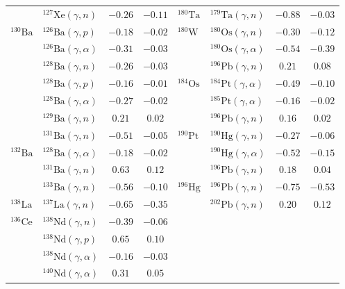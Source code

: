 \begin{table}
\begin{tabular}{llcc|llcc}
    $ $ & $^{127}\mathrm{Xe}(\gamma,n)$ & $-0.26$ & $-0.11$ & $^{180}\mathrm{Ta}$ & $^{179}\mathrm{Ta}(\gamma,n)$ & $-0.88$ & $-0.03$ \\ 
    $^{130}\mathrm{Ba}$ & $^{126}\mathrm{Ba}(\gamma,p)$ & $-0.18$ & $-0.02$ & $^{180}\mathrm{W}$ & $^{180}\mathrm{Os}(\gamma,n)$ & $-0.30$ & $-0.12$ \\ 
    $ $ & $^{126}\mathrm{Ba}(\gamma,\alpha)$ & $-0.31$ & $-0.03$ & $ $ & $^{180}\mathrm{Os}(\gamma,\alpha)$ & $-0.54$ & $-0.39$ \\ 
    $ $ & $^{128}\mathrm{Ba}(\gamma,n)$ & $-0.26$ & $-0.03$ & $ $ & $^{196}\mathrm{Pb}(\gamma,n)$ & $0.21$ & $0.08$ \\ 
    $ $ & $^{128}\mathrm{Ba}(\gamma,p)$ & $-0.16$ & $-0.01$ & $^{184}\mathrm{Os}$ & $^{184}\mathrm{Pt}(\gamma,\alpha)$ & $-0.49$ & $-0.10$ \\ 
    $ $ & $^{128}\mathrm{Ba}(\gamma,\alpha)$ & $-0.27$ & $-0.02$ & $ $ & $^{185}\mathrm{Pt}(\gamma,\alpha)$ & $-0.16$ & $-0.02$ \\ 
    $ $ & $^{129}\mathrm{Ba}(\gamma,n)$ & $0.21$ & $0.02$ & $ $ & $^{196}\mathrm{Pb}(\gamma,n)$ & $0.16$ & $0.02$ \\ 
    $ $ & $^{131}\mathrm{Ba}(\gamma,n)$ & $-0.51$ & $-0.05$ & $^{190}\mathrm{Pt}$ & $^{190}\mathrm{Hg}(\gamma,n)$ & $-0.27$ & $-0.06$ \\ 
    $^{132}\mathrm{Ba}$ & $^{128}\mathrm{Ba}(\gamma,\alpha)$ & $-0.18$ & $-0.02$ & $ $ & $^{190}\mathrm{Hg}(\gamma,\alpha)$ & $-0.52$ & $-0.15$ \\ 
    $ $ & $^{131}\mathrm{Ba}(\gamma,n)$ & $0.63$ & $0.12$ & $ $ & $^{196}\mathrm{Pb}(\gamma,n)$ & $0.18$ & $0.04$ \\ 
    $ $ & $^{133}\mathrm{Ba}(\gamma,n)$ & $-0.56$ & $-0.10$ & $^{196}\mathrm{Hg}$ & $^{196}\mathrm{Pb}(\gamma,n)$ & $-0.75$ & $-0.53$ \\ 
    $^{138}\mathrm{La}$ & $^{137}\mathrm{La}(\gamma,n)$ & $-0.65$ & $-0.35$ & $ $ & $^{202}\mathrm{Pb}(\gamma,n)$ & $0.20$ & $0.12$ \\ 
    $^{136}\mathrm{Ce}$ & $^{138}\mathrm{Nd}(\gamma,n)$ & $-0.39$ & $-0.06$ & $ $ & $ $ &  &  \\ 
    $ $ & $^{138}\mathrm{Nd}(\gamma,p)$ & $0.65$ & $0.10$ & $ $ & $ $ &  &  \\ 
    $ $ & $^{138}\mathrm{Nd}(\gamma,\alpha)$ & $-0.16$ & $-0.03$ & $ $ & $ $ &  &  \\ 
    $ $ & $^{140}\mathrm{Nd}(\gamma,\alpha)$ & $0.31$ & $0.05$ & $ $ & $ $ &  &  \\ 
    \toprule
    \end{tabular}
\end{table}

